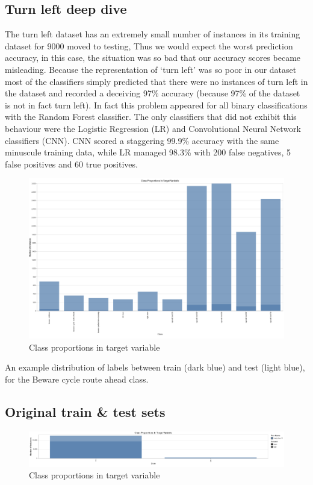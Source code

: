 \documentclass[11pt]{article}
\begin{document}
\subsection{Turn left deep dive}
The turn left dataset has an extremely small number of instances in its training dataset for 9000 moved to testing, Thus we would expect the worst prediction accuracy, in this case, the situation was so bad that our accuracy scores became misleading. Because the representation of ‘turn left’ was so poor in our dataset most of the classifiers simply predicted that there were no instances of turn left in the dataset and recorded a deceiving 97\% accuracy (because 97\% of the dataset is not in fact turn left). In fact this problem appeared for all binary classifications with the Random Forest classifier.
The only classifiers that did not exhibit this behaviour were the Logistic Regression (LR) and Convolutional Neural Network classifiers (CNN). CNN scored a staggering 99.9\% accuracy with the same minuscule training data, while LR managed 98.3\% with 200 false negatives, 5 false positives and 60 true positives.
\newline
\par
\begin{figure}[h]
  \caption {Class proportions in target variable}
  \centering 
  \includegraphics[width = \textwidth, height = 0.5\textheight, keepaspectratio]{Images/classProportionsInTargetVariable.png}
\end{figure}
An example distribution of labels between train (dark blue) and test (light blue), for the Beware cycle route ahead class. 

\newpage
\subsection{Original train \& test sets}
\begin{figure}[h]
  \caption {Class proportions in target variable}
  \centering 
  \includegraphics[width = \textwidth, height = 0.5\textheight, keepaspectratio]{Images/Sec1Original.png}
\end{figure}
\end{document}
